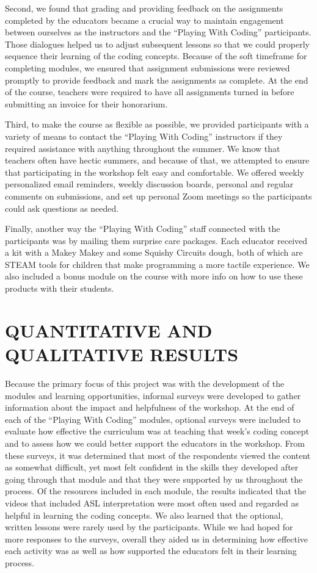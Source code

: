 \documentclass[11.5pt]{sig-alternate} %
\begin{document}
\begin{large}
Second, we found that grading and providing feedback on the assignments completed by the educators became a crucial way to maintain engagement between ourselves as the instructors and the “Playing With Coding” participants. Those dialogues helped us to adjust subsequent lessons so that we could properly sequence their learning of the coding concepts. Because of the soft timeframe for completing modules, we ensured that assignment submissions were reviewed promptly to provide feedback and mark the assignments as complete. At the end of the course, teachers were required to have all assignments turned in before submitting an invoice for their honorarium.

Third, to make the course as flexible as possible, we provided participants with a variety of means to contact the “Playing With Coding” instructors if they required assistance with anything throughout the summer. We know that teachers often have hectic summers, and because of that, we attempted to ensure that participating in the workshop felt easy and comfortable. We offered weekly personalized email reminders, weekly discussion boards, personal and regular comments on submissions, and set up personal Zoom meetings so the participants could ask questions as needed.

Finally, another way the “Playing With Coding” staff connected with the participants was by mailing them surprise care packages. Each educator received a kit with a Makey Makey and some Squishy Circuits dough, both of which are STEAM tools for children that make programming a more tactile experience. We also included a bonus module on the course with more info on how to use these products with their students.

\section*{QUANTITATIVE AND QUALITATIVE RESULTS}

Because the primary focus of this project was with the development of the modules and learning  opportunities, informal surveys were developed to gather information about the impact and helpfulness of the workshop. At the end of each of the “Playing With Coding” modules, optional surveys were included to evaluate how effective the curriculum was at teaching that week’s coding concept and to assess how we could better support the educators in the workshop. From these surveys, it was determined that most of the respondents viewed the content as somewhat difficult, yet most felt confident in the skills they developed after going through that module and that they were supported by us throughout the process. Of  the resources included in each module, the results indicated that the videos that included ASL interpretation were most often used and regarded as helpful in learning the coding concepts. We also learned that the optional, written lessons were rarely used by the participants. While we had hoped for more responses to the surveys, overall they aided us in determining how effective each activity was as well as how supported the educators felt in their learning process.


\end{large}
\end{document}
